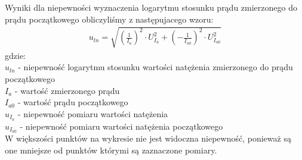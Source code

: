 \documentclass[a4paper]{article}
\newlength{\du}
\begin{document}
Wyniki dla niepewności wyznaczenia logarytmu stosunku prądu zmierzonego do prądu początkowego obliczyliśmy z następujacego wzoru:
\begin{align*}
u_{ln} = \sqrt{(\frac{1}{I_{a}})^2 \cdot U_{I_{a}}^2 + (- \frac{1}{I_{a0}})^2 \cdot U_{I_{a0}}^2 }
\end{align*}
gdzie:\\
$u_{ln}$ - niepewność logarytmu stosunku wartości natężenia zmierzonego do prądu początkowego \\
$I_{a}$ - wartość zmierzonego prądu\\
$I_{a0}$ - wartość prądu początkowego\\
$u_{I_{a}}$ - niepewność pomiaru wartości natężenia \\
$u_{I_{a0}}$ - niepewność pomiaru wartości natężenia początkowego \\

W większości punktów na wykresie nie jest widoczna niepewność, ponieważ są one mniejsze od punktów którymi są zaznaczone pomiary.
\end{document}
